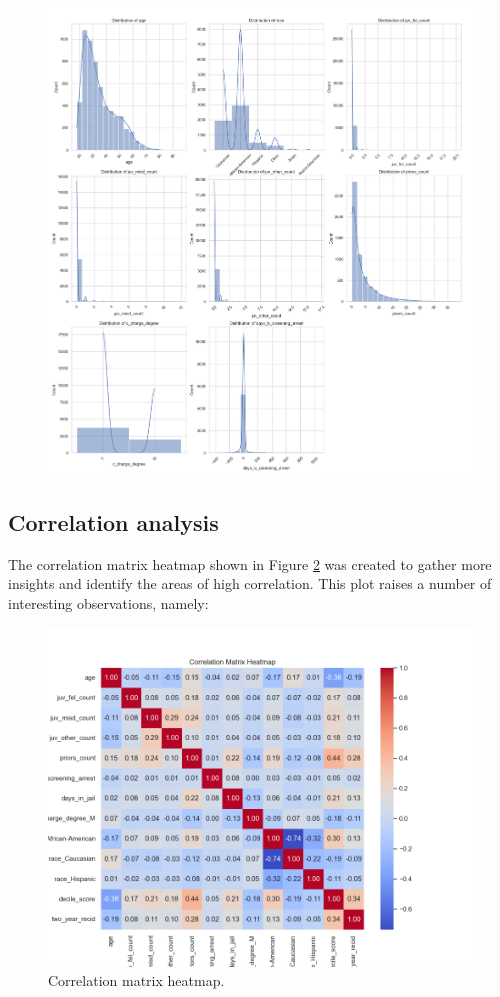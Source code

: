 \begin{figure}[H]
	\centering
	\includegraphics[width=0.9\linewidth]{img/distribution-plots}
	\caption{}
	\label{fig:distribution-plots}
\end{figure}


\subsection{Correlation analysis}

The correlation matrix heatmap shown in Figure \ref{fig:correlationmatrixheatmap} was created to gather more insights and identify the areas of high correlation. This plot raises a number of interesting observations, namely:

\begin{figure}[H]
	\centering
	\includegraphics[width=0.7\linewidth]{img/correlation_matrix_heatmap}
	\caption{Correlation matrix heatmap.}
	\label{fig:correlationmatrixheatmap}
\end{figure}


